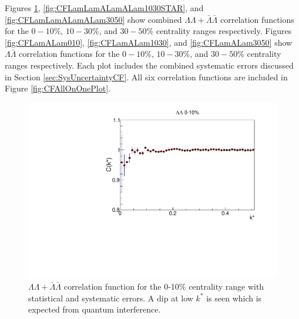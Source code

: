 Figures \ref{fig:CFLamLamALamALam010}, \ref{fig:CFLamLamALamALam1030STAR}, and \ref{fig:CFLamLamALamALam3050} show combined $\Lambda\Lambda + \bar{\Lambda}\bar{\Lambda}$ correlation functions for the $0-10$\%, $10-30$\%, and $30-50$\% centrality ranges respectively.  
Figures \ref{fig:CFLamALam010}, \ref{fig:CFLamALam1030}, and \ref{fig:CFLamALam3050} show $\Lambda\bar{\Lambda}$ correlation functions for the $0-10$\%, $10-30$\%, and $30-50$\% centrality ranges respectively.  
Each plot includes the combined systematic errors discussed in Section \ref{sec:SysUncertaintyCF}.
All six correlation functions are included in Figure \ref{fig:CFAllOnOnePlot}.

\begin{figure}[hbtp]
\includegraphics[width=36pc]{Figures/CFs/2016-8-30-CFLLAA010CombinedSystematicsMaximum.pdf}
\caption[$\Lambda\Lambda + \bar{\Lambda}\bar{\Lambda}$ correlation function for the 0-10\% centrality range]{$\Lambda\Lambda + \bar{\Lambda}\bar{\Lambda}$ correlation function for the 0-10\% centrality range with statistical and systematic errors.  
A dip at low $k^*$ is seen which is expected from quantum interference.}
\label{fig:CFLamLamALamALam010}
\end{figure}


